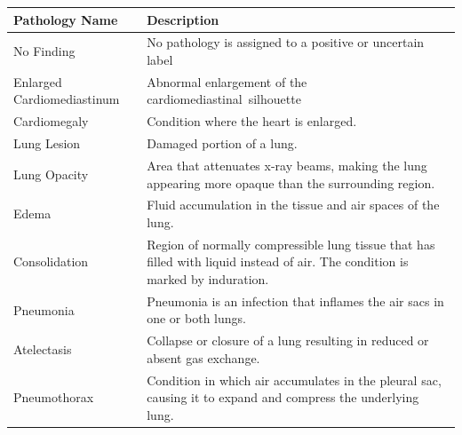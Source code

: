 \begin{table}[h!]

\centering

\begin{tabularx}{\textwidth}{|l|X|}
\hline
\textbf{Pathology Name}    & \textbf{Description}                                                                                 \\ 
\hline
No Finding                 & No pathology is assigned to a positive or uncertain label                                            \\ 
\hline
Enlarged Cardiomediastinum & Abnormal enlargement of the cardiomediastinal~silhouette                                             \\ 
\hline
Cardiomegaly               & Condition where the heart is enlarged.                                                                \\ 
\hline
Lung Lesion                & Damaged portion of a lung.                                                                           \\ 
\hline
Lung Opacity               & Area that attenuates x-ray beams, making the lung appearing more opaque than the surrounding region.  \\ 
\hline
Edema                      & Fluid accumulation in the tissue and air spaces of the lung.                                                                                                 \\ 
\hline
Consolidation              & Region of normally compressible lung tissue that has filled with liquid instead of air. The condition is marked by induration.                                                                                                    \\ 
\hline
Pneumonia                  & Pneumonia is an infection that inflames the air sacs in one or both lungs.                                                                                                      \\ 
\hline
Atelectasis                & Collapse or closure of a lung resulting in reduced or absent gas exchange.                                                                                                     \\ 
\hline
Pneumothorax               & Condition in which air accumulates in the pleural sac, causing it to expand and compress the underlying lung.                                                                                                     \\ 

\end{tabularx}
\end{table}
